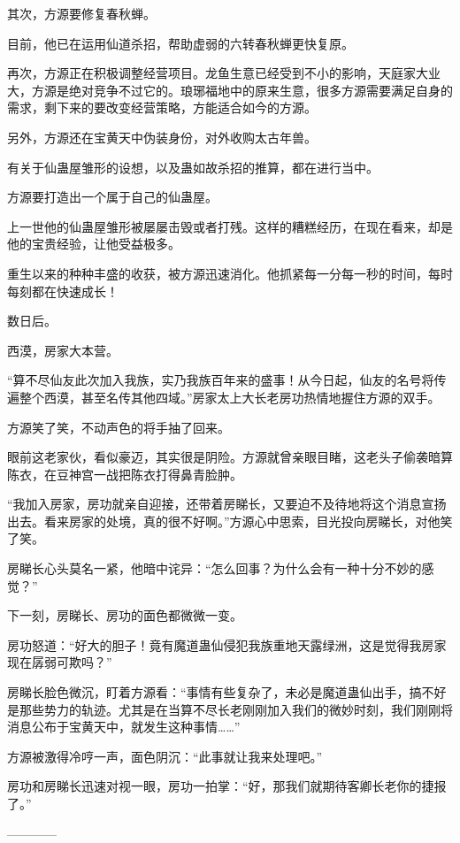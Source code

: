 \begin{this_body}
其次，方源要修复春秋蝉。

目前，他已在运用仙道杀招，帮助虚弱的六转春秋蝉更快复原。

再次，方源正在积极调整经营项目。龙鱼生意已经受到不小的影响，天庭家大业大，方源是绝对竞争不过它的。琅琊福地中的原来生意，很多方源需要满足自身的需求，剩下来的要改变经营策略，方能适合如今的方源。

另外，方源还在宝黄天中伪装身份，对外收购太古年兽。

有关于仙蛊屋雏形的设想，以及蛊如故杀招的推算，都在进行当中。

方源要打造出一个属于自己的仙蛊屋。

上一世他的仙蛊屋雏形被屡屡击毁或者打残。这样的糟糕经历，在现在看来，却是他的宝贵经验，让他受益极多。

重生以来的种种丰盛的收获，被方源迅速消化。他抓紧每一分每一秒的时间，每时每刻都在快速成长！

数日后。

西漠，房家大本营。

“算不尽仙友此次加入我族，实乃我族百年来的盛事！从今日起，仙友的名号将传遍整个西漠，甚至名传其他四域。”房家太上大长老房功热情地握住方源的双手。

方源笑了笑，不动声色的将手抽了回来。

眼前这老家伙，看似豪迈，其实很是阴险。方源就曾亲眼目睹，这老头子偷袭暗算陈衣，在豆神宫一战把陈衣打得鼻青脸肿。

“我加入房家，房功就亲自迎接，还带着房睇长，又要迫不及待地将这个消息宣扬出去。看来房家的处境，真的很不好啊。”方源心中思索，目光投向房睇长，对他笑了笑。

房睇长心头莫名一紧，他暗中诧异：“怎么回事？为什么会有一种十分不妙的感觉？”

下一刻，房睇长、房功的面色都微微一变。

房功怒道：“好大的胆子！竟有魔道蛊仙侵犯我族重地天露绿洲，这是觉得我房家现在孱弱可欺吗？”

房睇长脸色微沉，盯着方源看：“事情有些复杂了，未必是魔道蛊仙出手，搞不好是那些势力的轨迹。尤其是在当算不尽长老刚刚加入我们的微妙时刻，我们刚刚将消息公布于宝黄天中，就发生这种事情……”

方源被激得冷哼一声，面色阴沉：“此事就让我来处理吧。”

房功和房睇长迅速对视一眼，房功一拍掌：“好，那我们就期待客卿长老你的捷报了。”

------------

\end{this_body}

